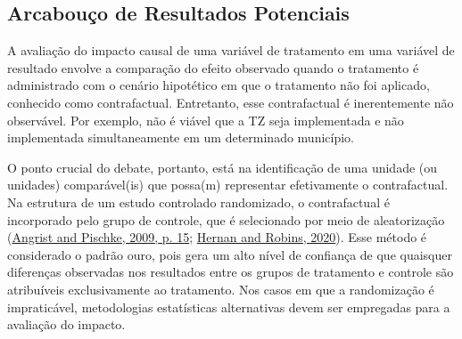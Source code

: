 \documentclass[12pt, a4paper, twoside]{article}
\numberwithin{equation}{subsection} %
\begin{document}
\hypertarget{sec-po}{%
\subsection{Arcabouço de Resultados Potenciais}\label{sec-po}}

A avaliação do impacto causal de uma variável de tratamento em uma
variável de resultado envolve a comparação do efeito observado quando o
tratamento é administrado com o cenário hipotético em que o tratamento
não foi aplicado, conhecido como contrafactual. Entretanto, esse
contrafactual é inerentemente não observável. Por exemplo, não é viável
que a TZ seja implementada e não implementada simultaneamente em um
determinado município.

O ponto crucial do debate, portanto, está na identificação de uma
unidade (ou unidades) comparável(is) que possa(m) representar
efetivamente o contrafactual. Na estrutura de um estudo controlado
randomizado, o contrafactual é incorporado pelo grupo de controle, que é
selecionado por meio de aleatorização
(\protect\hyperlink{ref-mostly_harmless_econometrics}{Angrist and
Pischke, 2009, p. 15}; \protect\hyperlink{ref-Hernan2020}{Hernan and
Robins, 2020}). Esse método é considerado o padrão ouro, pois gera um
alto nível de confiança de que quaisquer diferenças observadas nos
resultados entre os grupos de tratamento e controle são atribuíveis
exclusivamente ao tratamento. Nos casos em que a randomização é
impraticável, metodologias estatísticas alternativas devem ser
empregadas para a avaliação do impacto.
\end{document}
